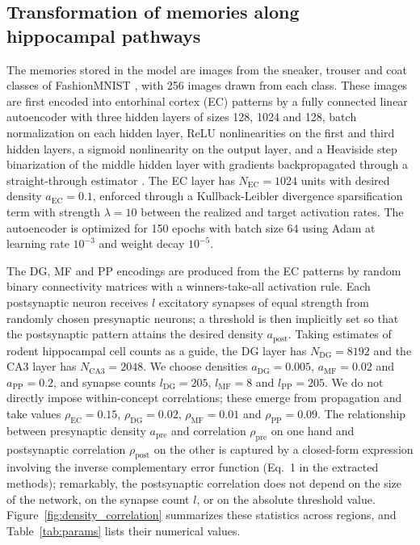 \documentclass[11pt]{article}
\begin{document}
\subsection{Transformation of memories along hippocampal pathways}

The memories stored in the model are images from the sneaker, trouser and
coat classes of FashionMNIST \cite{xiao2017fashion}, with 256 images drawn
from each class. These images are first encoded into entorhinal cortex (EC)
patterns by a fully connected linear autoencoder with three hidden layers of
sizes 128, 1024 and 128, batch normalization on each hidden layer, ReLU
nonlinearities on the first and third hidden layers, a sigmoid nonlinearity
on the output layer, and a Heaviside step binarization of the middle hidden
layer with gradients backpropagated through a straight-through estimator
\cite{bengio2013estimating}. The EC layer has $N_{\mathrm{EC}} = 1024$ units
with desired density $a_{\mathrm{EC}} = 0.1$, enforced through a
Kullback-Leibler divergence sparsification term with strength $\lambda = 10$
between the realized and target activation rates. The autoencoder is
optimized for 150 epochs with batch size 64 using Adam
\cite{kingma2015adam} at learning rate $10^{-3}$ and weight decay $10^{-5}$.

The DG, MF and PP encodings are produced from the EC patterns by random
binary connectivity matrices with a winners-take-all activation rule. Each
postsynaptic neuron receives $l$ excitatory synapses of equal strength from
randomly chosen presynaptic neurons; a threshold is then implicitly set so
that the postsynaptic pattern attains the desired density $a_{\mathrm{post}}$.
Taking estimates of rodent hippocampal cell counts as a guide, the DG layer
has $N_{\mathrm{DG}} = 8192$ and the CA3 layer has $N_{\mathrm{CA3}} = 2048$.
We choose densities $a_{\mathrm{DG}} = 0.005$, $a_{\mathrm{MF}} = 0.02$ and
$a_{\mathrm{PP}} = 0.2$, and synapse counts $l_{\mathrm{DG}} = 205$,
$l_{\mathrm{MF}} = 8$ and $l_{\mathrm{PP}} = 205$. We do not directly impose
within-concept correlations; these emerge from propagation and take values
$\rho_{\mathrm{EC}} = 0.15$, $\rho_{\mathrm{DG}} = 0.02$,
$\rho_{\mathrm{MF}} = 0.01$ and $\rho_{\mathrm{PP}} = 0.09$. The relationship
between presynaptic density $a_{\mathrm{pre}}$ and correlation
$\rho_{\mathrm{pre}}$ on one hand and postsynaptic correlation
$\rho_{\mathrm{post}}$ on the other is captured by a closed-form expression
involving the inverse complementary error function (Eq.~1 in the extracted
methods); remarkably, the postsynaptic correlation does not depend on the
size of the network, on the synapse count $l$, or on the absolute threshold
value. Figure~\ref{fig:density_correlation} summarizes these statistics
across regions, and Table~\ref{tab:params} lists their numerical values.
\end{document}
